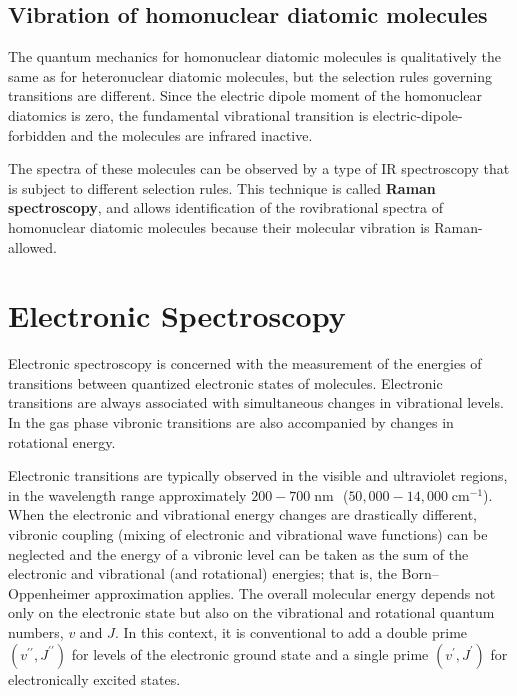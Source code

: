 \documentclass[
  9pt,
]{extbook}
\theoremstyle{definition}
\theoremstyle{definition}
\theoremstyle{definition}
\theoremstyle{remark}
\begin{document}
\hypertarget{vibration-of-homonuclear-diatomic-molecules}{%
\subsection{Vibration of homonuclear diatomic molecules}\label{vibration-of-homonuclear-diatomic-molecules}}

The quantum mechanics for homonuclear diatomic molecules is qualitatively the same as for heteronuclear diatomic molecules, but the selection rules governing transitions are different. Since the electric dipole moment of the homonuclear diatomics is zero, the fundamental vibrational transition is electric-dipole-forbidden and the molecules are infrared inactive.

The spectra of these molecules can be observed by a type of IR spectroscopy that is subject to different selection rules. This technique is called \textbf{Raman spectroscopy}, and allows identification of the rovibrational spectra of homonuclear diatomic molecules because their molecular vibration is Raman-allowed.

\hypertarget{electronic-spectroscopy}{%
\section{Electronic Spectroscopy}\label{electronic-spectroscopy}}

Electronic spectroscopy is concerned with the measurement of the energies of transitions between quantized electronic states of molecules. Electronic transitions are always associated with simultaneous changes in vibrational levels. In the gas phase vibronic transitions are also accompanied by changes in rotational energy.

Electronic transitions are typically observed in the visible and ultraviolet regions, in the wavelength range approximately \(200-700\; \text{nm }\) (\(50,000-14,000\; \text{cm}^{-1}\)). When the electronic and vibrational energy changes are drastically different, vibronic coupling (mixing of electronic and vibrational wave functions) can be neglected and the energy of a vibronic level can be taken as the sum of the electronic and vibrational (and rotational) energies; that is, the Born--Oppenheimer approximation applies. The overall molecular energy depends not only on the electronic state but also on the vibrational and rotational quantum numbers, \(v\) and \(J\). In this context, it is conventional to add a double prime \(\left(v^{\prime\prime},J^{\prime\prime}\right)\) for levels of the electronic ground state and a single prime \(\left(v^{\prime},J^{\prime}\right)\) for electronically excited states.
\end{document}
